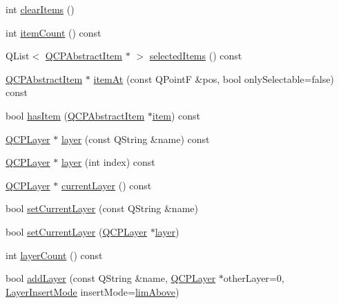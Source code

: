 \begin{DoxyCompactItemize}
\item 
int \hyperlink{class_q_custom_plot_abdfd07d4f0591d0cf967f85013fd3645}{clear\+Items} ()
\item 
int \hyperlink{class_q_custom_plot_a16025daf0341f9362be3080e404424c2}{item\+Count} () const
\item 
Q\+List$<$ \hyperlink{class_q_c_p_abstract_item}{Q\+C\+P\+Abstract\+Item} $\ast$ $>$ \hyperlink{class_q_custom_plot_afda487bcf2d6cf1a57173d82495e29ba}{selected\+Items} () const
\item 
\hyperlink{class_q_c_p_abstract_item}{Q\+C\+P\+Abstract\+Item} $\ast$ \hyperlink{class_q_custom_plot_ac08578e0e6c059c83a8d340ba0038e8e}{item\+At} (const Q\+PointF \&pos, bool only\+Selectable=false) const
\item 
bool \hyperlink{class_q_custom_plot_af0b57f35646079f93fa6161a65b36109}{has\+Item} (\hyperlink{class_q_c_p_abstract_item}{Q\+C\+P\+Abstract\+Item} $\ast$\hyperlink{class_q_custom_plot_ac042f2e78edd228ccf2f26b7fe215239}{item}) const
\item 
\hyperlink{class_q_c_p_layer}{Q\+C\+P\+Layer} $\ast$ \hyperlink{class_q_custom_plot_a0a96244e7773b242ef23c32b7bdfb159}{layer} (const Q\+String \&name) const
\item 
\hyperlink{class_q_c_p_layer}{Q\+C\+P\+Layer} $\ast$ \hyperlink{class_q_custom_plot_acbb570f4c24306e7c2324d40bfe157c2}{layer} (int index) const
\item 
\hyperlink{class_q_c_p_layer}{Q\+C\+P\+Layer} $\ast$ \hyperlink{class_q_custom_plot_a0421d647f420b0b4c57aec1708857af5}{current\+Layer} () const
\item 
bool \hyperlink{class_q_custom_plot_a73a6dc47c653bb6f8f030abca5a11852}{set\+Current\+Layer} (const Q\+String \&name)
\item 
bool \hyperlink{class_q_custom_plot_a23a4d3cadad1a0063c5fe19aac5659e6}{set\+Current\+Layer} (\hyperlink{class_q_c_p_layer}{Q\+C\+P\+Layer} $\ast$\hyperlink{class_q_custom_plot_a0a96244e7773b242ef23c32b7bdfb159}{layer})
\item 
int \hyperlink{class_q_custom_plot_afa45d61e65292026f4c58c9c88c2cef0}{layer\+Count} () const
\item 
bool \hyperlink{class_q_custom_plot_ad5255393df078448bb6ac83fa5db5f52}{add\+Layer} (const Q\+String \&name, \hyperlink{class_q_c_p_layer}{Q\+C\+P\+Layer} $\ast$other\+Layer=0, \hyperlink{class_q_custom_plot_a75a8afbe6ef333b1f3d47abb25b9add7}{Layer\+Insert\+Mode} insert\+Mode=\hyperlink{class_q_custom_plot_a75a8afbe6ef333b1f3d47abb25b9add7a062b0b7825650b432a713c0df6742d41}{lim\+Above})

\end{DoxyCompactItemize}
